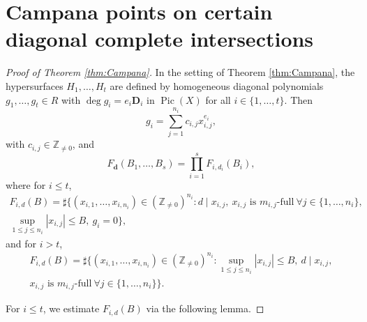 \documentclass[10pt, a4paper, reqno, english]{amsart}
\newcommand\ZZ{\mathbb{Z}}
\newcommand{\divclass}{{\mathbf D}} %
\DeclareMathOperator{\pic}{Pic} %
\theoremstyle{definition}
\numberwithin{theorem}{section}
\numberwithin{equation}{section}
\begin{document}
\section{Campana points on certain diagonal complete intersections}
\label{sec:Campana}
\begin{proof}[Proof of Theorem \ref{thm:Campana}]

In the setting of Theorem \ref{thm:Campana}, the hypersurfaces $H_1,\dots,H_t$ are defined by homogeneous diagonal polynomials $g_1,\dots,g_t\in R$ with $\deg g_i=e_i\divclass_i$ in $\pic(X)$ for all $i\in\{1,\dots,t\}$.
Then
$$
g_{i}=\sum_{j=1}^{n_i} c_{i,j}x_{i,j}^{e_i}, 
$$
with $c_{i,j}\in\ZZ_{\neq0}$, and 
	$$ F_{\mathbf d}(B_1,\dots,B_s)
	=\prod_{i=1}^sF_{i,d_i}(B_i),
	$$
	where for $i\leq t$,
	\begin{multline*}
	F_{i,d}(B)=\sharp\{(x_{i,1},\dots,x_{i,n_i})\in(\ZZ_{\neq 0})^{n_i}: 
	 d\mid x_{i,j}, \
	 x_{i,j} \text{ is } m_{i,j}\text{-full} \ \forall j\in\{1,\dots,n_i\}, \\
	 \sup_{1\leq j\leq n_{i}}|x_{i,j}|\leq B, \
	  g_i=0\},
	 \end{multline*}
and for $i>t$,
\begin{multline}
	F_{i,d}(B)=\sharp\{(x_{i,1},\dots,x_{i,n_i})\in(\ZZ_{\neq 0})^{n_i}: 
	 \sup_{1\leq j\leq n_{i}}|x_{i,j}|\leq B, \
	 d\mid x_{i,j}, \\ x_{i,j} \text{ is } m_{i,j}\text{-full} \ \forall j\in\{1,\dots,n_i\}\}.
	 \label{eq:campana coord}
	 \end{multline}

For $i\leq t$, we estimate $F_{i,d}(B)$ via the following lemma.


\end{proof}
\end{document}
